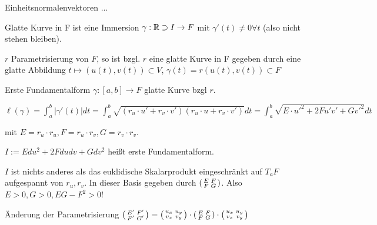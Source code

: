 \begin{defi}{Einheitsnormalenvektoren}
    ... %
\end{defi}

\begin{defi}{Glatte Kurve}
    in F ist eine Immersion
    $\gamma:\mathbb R\supset I\to F$ 
    mit $\gamma'(t) \neq 0 \forall t$ (also nicht stehen bleiben).
\end{defi}

\begin{bem}
    $r$ Parametrisierung von $F$, so ist bzgl. $r$ eine glatte Kurve in F gegeben durch
    eine glatte Abbildung $t\mapsto (u(t),v(t))\subset V$, 
    $\gamma(t) = r(u(t), v(t)) \subset F$
\end{bem}

\begin{defi}{Erste Fundamentalform}
    $\gamma:[a,b] \to F$ glatte Kurve bzgl $r$. 

    $\ell(\gamma) = \int_a^b |\gamma'(t)|dt = 
        \int_a^b \sqrt{(r_u\cdot u'+r_v\cdot v')(r_u\cdot u+r_v\cdot v')} dt =
        \int_a^b \sqrt{E\cdot u'^2 + 2Fu'v' + Gv'^2} dt$

    mit $E=r_u\cdot r_u, F=r_u\cdot r_v, G=r_v\cdot r_v$.
    
    $I:= Edu^2 + 2Fdudv + Gdv^2$ heißt erste Fundamentalform.
\end{defi}

\begin{bem}
    $I$ ist nichts anderes als das euklidische Skalarprodukt eingeschränkt auf
    $T_aF$ aufgespannt von $r_u, r_v$.
    In dieser Basis gegeben durch 
    $\begin{psmallmatrix}
        E & F \\ F & G \\
    \end{psmallmatrix}$.
    Also $E>0, G>0, EG-F^2>0$!
\end{bem}

\begin{bem}{Änderung der Parametrisierung}
    $\begin{psmallmatrix}
        E' & F' \\ F' & G' \\
    \end{psmallmatrix} = 
    \begin{psmallmatrix}
        u_x & u_y \\ v_x & v_y \\
    \end{psmallmatrix}
    \cdot
    \begin{psmallmatrix}
        E & F \\ F & G \\
    \end{psmallmatrix}
    \cdot
    \begin{psmallmatrix}
        u_x & u_y \\ v_x & v_y \\
    \end{psmallmatrix}$
\end{bem}

